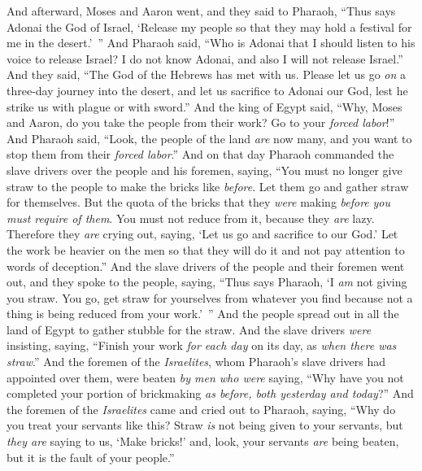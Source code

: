 \begin{biblechapter} %
 And afterward, Moses and Aaron went, and they said to Pharaoh, “Thus says Adonai the God of Israel, ‘Release my people so that they may hold a festival for me in the desert.’ ”
\verse And Pharaoh said, “Who is Adonai that I should listen to his voice to release Israel? I do not know Adonai, and also I will not release Israel.”
\verse And they said, “The God of the Hebrews has met with us. Please let us go \textit{on} a three-day journey into the desert, and let us sacrifice to Adonai our God, lest he strike us with plague or with sword.”
\verse And the king of Egypt said, “Why, Moses and Aaron, do you take the people from their work? Go to your \textit{forced labor}!”
\verse And Pharaoh said, “Look, the people of the land \textit{are} now many, and you want to stop them from their \textit{forced labor}.”
\verse And on that day Pharaoh commanded the slave drivers over the people and his foremen, saying,
\verse “You must no longer give straw to the people to make the bricks like \textit{before}. Let them go and gather straw for themselves.
\verse But the quota of the bricks that they \textit{were} making \textit{before} \textit{you must require of them}. You must not reduce from it, because they \textit{are} lazy. Therefore they \textit{are} crying out, saying, ‘Let us go and sacrifice to our God.’
\verse Let the work be heavier on the men so that they will do it and not pay attention to words of deception.”
\verse And the slave drivers of the people and their foremen went out, and they spoke to the people, saying, “Thus says Pharaoh, ‘I \textit{am} not giving you straw.
\verse You go, get straw for yourselves from whatever you find because not a thing is being reduced from your work.’ ”
\verse And the people spread out in all the land of Egypt to gather stubble for the straw.
\verse And the slave drivers \textit{were} insisting, saying, “Finish your work \textit{for each day} on its day, as \textit{when there was straw}.”
\verse And the foremen of the \textit{Israelites}, whom Pharaoh’s slave drivers had appointed over them, were beaten \textit{by men who were} saying, “Why have you not completed your portion of brickmaking \textit{as before, both yesterday and today}?”
 And the foremen of the \textit{Israelites} came and cried out to Pharaoh, saying, “Why do you treat your servants like this?
\verse Straw \textit{is} not being given to your servants, but \textit{they are} saying to us, ‘Make bricks!’ and, look, your servants \textit{are} being beaten, but it is the fault of your people.”

\end{biblechapter}
